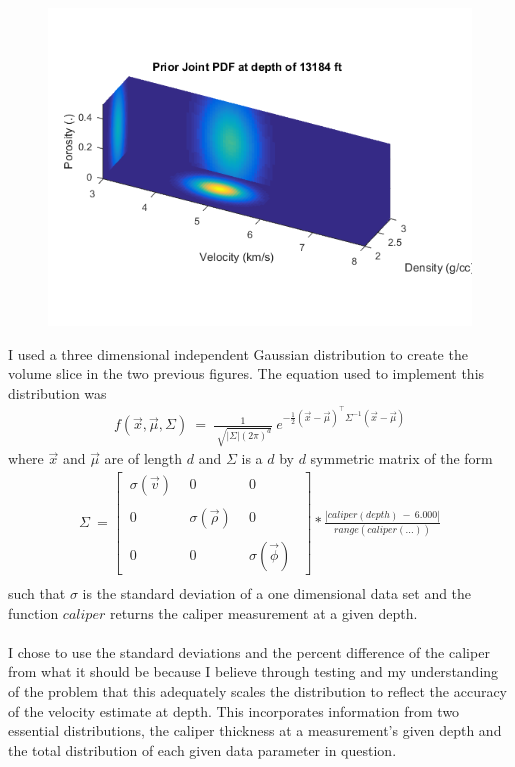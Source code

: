 \documentclass[12pt,runningheads]{article}
\begin{document}
\begin{enumerate}
\begin{figure}[!h]
\includegraphics[width=\textwidth]{PriorP.png}
\end{figure}
I used a three dimensional independent Gaussian distribution to create the volume slice in the two previous figures. The equation used to implement this distribution was
\begin{align*}
f(\vec{x},\vec{\mu},\Sigma)\ =\ \frac{1}{\sqrt[]{|\Sigma|(2\pi)^{d}}}\ e^{-\frac{1}{2}(\vec{x}-\vec{\mu})^{\top}\Sigma^{-1}(\vec{x}-\vec{\mu})}
\end{align*}
where $\vec{x}$ and $\vec{\mu}$ are of length $d$ and $\Sigma$ is a $d$ by $d$ symmetric matrix of the form
\begin{align*}
\Sigma\ =
\begin{bmatrix}
\ \sigma(\vec{v})\ &\ 0\ &\ 0\ \ \\ \\
\ 0\ &\ \sigma(\vec{\rho})\ &\ 0\ \ \\ \\
\ 0\ &\ 0\ &\ \sigma(\vec{\phi})\ \
\end{bmatrix}
*\frac{|caliper(depth)\ -\ 6.000|}{range(caliper(...))}\\
\end{align*}
such that $\sigma$ is the standard deviation of a one dimensional data set and the function $caliper$ returns the caliper measurement at a given depth.\\ \\
I chose to use the standard deviations and the percent difference of the caliper from what it should be because I believe through testing and my understanding of the problem that this adequately scales the distribution to reflect the accuracy of the velocity estimate at depth. This incorporates information from two essential distributions, the caliper thickness at a measurement's given depth and the total distribution of each given data parameter in question.


\end{enumerate}
\end{document}
